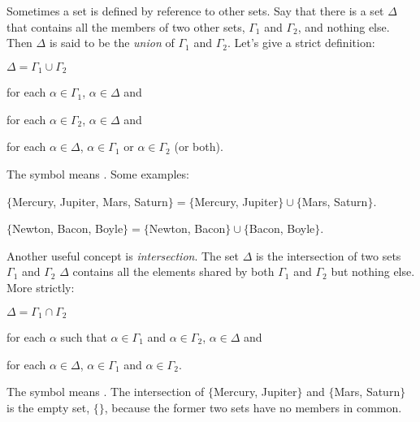 Sometimes a set is defined by reference to other sets. Say that there is a set $\Delta$ that contains all the members of two other sets, $\Gamma_1$ and $\Gamma_2$, and nothing else. Then $\Delta$ is said to be the \emph{union} of $\Gamma_1$ and $\Gamma_2$. Let's give a strict definition:

\begin{majorILnc}{} $\Delta=\Gamma_1\cup\Gamma_2$ \Iff 
	\begin{cenumerate}
		\item for each $\alpha \in \Gamma_1$, $\alpha \in \Delta$ and
		\item for each $\alpha \in \Gamma_2$, $\alpha \in \Delta$ and
		\item for each $\alpha \in \Delta$, $\alpha \in \Gamma_1$ or $\alpha \in \Gamma_2$ (or both).
	\end{cenumerate}	
\end{majorILnc} 

\noindent{}The symbol \mention{$\cup$} means . Some examples:

\begin{center}
	\noindent{}$\{$Mercury, Jupiter, Mars, Saturn$\}=\{$Mercury, Jupiter$\}\cup\{$Mars, Saturn$\}$.
\end{center}

\begin{center}
	\noindent{}$\{$Newton, Bacon, Boyle$\}=\{$Newton, Bacon$\}\cup\{$Bacon, Boyle$\}$.
\end{center}

Another useful concept is \emph{intersection}.  The set $\Delta$ is the intersection of two sets $\Gamma_1$ and $\Gamma_2$ \Iff $\Delta$ contains all the elements shared by both $\Gamma_1$ and $\Gamma_2$ but nothing else. More strictly:

\begin{majorILnc}{} $\Delta=\Gamma_1\cap\Gamma_2$ \Iff 
	\begin{cenumerate}
		\item for each $\alpha$ such that $\alpha \in \Gamma_1$ and $\alpha \in \Gamma_2$, $\alpha \in \Delta$ and
		\item for each $\alpha \in \Delta$, $\alpha \in \Gamma_1$ and $\alpha \in \Gamma_2$.
	\end{cenumerate}	
\end{majorILnc} 

The symbol \mention{$\cap$} means .
The intersection of $\{$Mercury, Jupiter$\}$ and $\{$Mars, Saturn$\}$ is the empty set, $\{ \}$, because the former two sets have no members in common.

